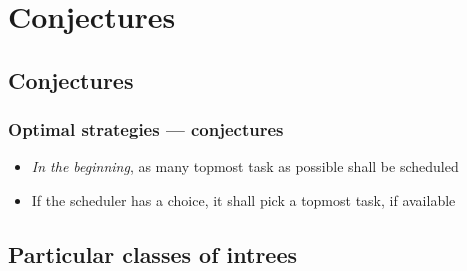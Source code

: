 \documentclass{beamer}
\begin{document}
\section{Conjectures}

\subsection{Conjectures}

\begin{frame}
  \frametitle{Optimal strategies --- conjectures}
  \begin{itemize}
  \item \emph{In the beginning}, as many topmost task as possible shall be scheduled
    
  \item If the scheduler has a choice, it shall pick a topmost task, if available
  \end{itemize}
\end{frame}

\subsection{Particular classes of intrees}
\end{document}
